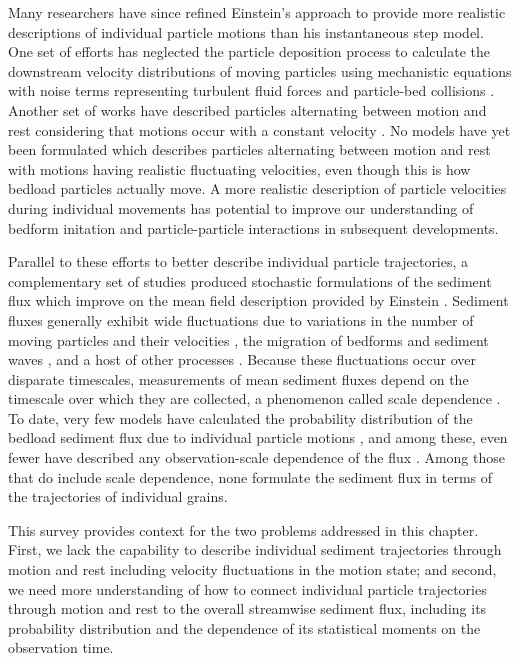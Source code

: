 Many researchers have since refined Einstein's approach to provide more realistic descriptions of individual particle motions than his instantaneous step model.
One set of efforts has neglected the particle deposition process to calculate the downstream velocity distributions of moving particles using mechanistic equations with noise terms representing turbulent fluid forces and particle-bed collisions \citep{Ancey2014,Fan2014}. 
Another set of works have described particles alternating between motion and rest considering that motions occur with a constant velocity \citep{Lisle1998,Lajeunesse2017}. 
No models have yet been formulated which describes particles alternating between motion and rest with motions having realistic fluctuating velocities, even though this is how bedload particles actually move.
A more realistic description of particle velocities during individual movements has potential to improve our understanding of bedform initation and particle-particle interactions in subsequent developments.

Parallel to these efforts to better describe individual particle trajectories, a complementary set of studies produced stochastic formulations of the sediment flux which improve on the mean field description provided by Einstein \citep{Turowski2010,Furbish2012a,Ancey2020}. 
Sediment fluxes generally exhibit wide fluctuations due to variations in the number of moving particles and their velocities \citep{Bohm2005a,Ancey2006,Furbish2012a}, the migration of bedforms and sediment waves \citep{Guala2014,Recking2012}, and a host of other processes \citep{Dhont2018}.
Because these fluctuations occur over disparate timescales, measurements of mean sediment fluxes depend on the timescale over which they are collected, a phenomenon called scale dependence \citep{Saletti2015,Dhont2018,Singh2009,Turowski2010,Ancey2020}.
To date, very few models have calculated the probability distribution of the bedload sediment flux due to individual particle motions \citep{Ancey2008,Ancey2014}, and among these, even fewer have described any observation-scale dependence of the flux \citep{Ancey2020a,Turowski2010}.
Among those that do include scale dependence, none formulate the sediment flux in terms of the trajectories of individual grains.

This survey provides context for the two problems addressed in this chapter.
First, we lack the capability to describe individual sediment trajectories through motion and rest including velocity fluctuations in the motion state; and second, we need more understanding of how to connect individual particle trajectories through motion and rest to the overall streamwise sediment flux, including its probability distribution and the dependence of its statistical moments on the observation time.

